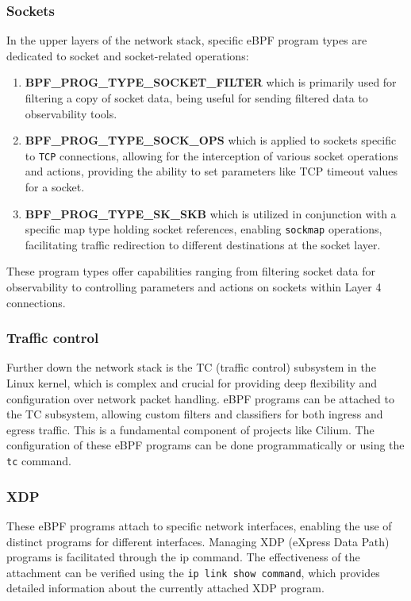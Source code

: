 \subsubsection{Sockets}

In the upper layers of the network stack, specific eBPF program types are dedicated to socket and socket-related operations:

\begin{enumerate}
    \item \textbf{BPF\_PROG\_TYPE\_SOCKET\_FILTER} which is primarily used for filtering a copy of socket data, being useful for sending filtered data to observability tools. 
    \item \textbf{BPF\_PROG\_TYPE\_SOCK\_OPS} which is applied to sockets specific to \texttt{TCP} connections, allowing for the interception of various socket operations and actions, providing the ability to set parameters like TCP timeout values for a socket. 
    \item \textbf{BPF\_PROG\_TYPE\_SK\_SKB} which is utilized in conjunction with a specific map type holding socket references, enabling \texttt{sockmap} operations, facilitating traffic redirection to different destinations at the socket layer.
\end{enumerate}

These program types offer capabilities ranging from filtering socket data for observability to controlling parameters and actions on sockets within Layer 4 connections.

\subsubsection{Traffic control}


Further down the network stack is the TC (traffic control) subsystem in the Linux kernel, which is complex and crucial for providing deep flexibility and configuration over network packet handling. eBPF programs can be attached to the TC subsystem, allowing custom filters and classifiers for both ingress and egress traffic. This is a fundamental component of projects like Cilium. The configuration of these eBPF programs can be done programmatically or using the \texttt{tc} command.


\subsubsection{XDP}

These eBPF programs attach to specific network interfaces, enabling the use of distinct programs for different interfaces. Managing XDP (eXpress Data Path) programs is facilitated through the ip command. The effectiveness of the attachment can be verified using the \texttt{ip link show command}, which provides detailed information about the currently attached XDP program.


